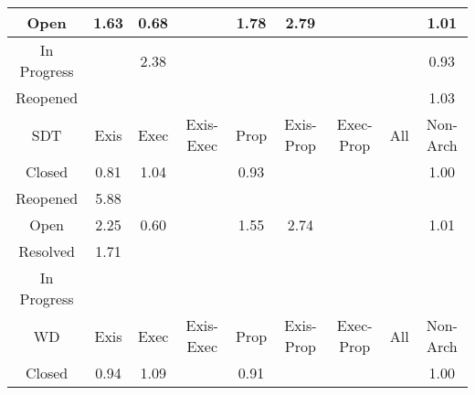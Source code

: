 \begin{tabular}{|c||c|c|c|c|c|c|c|c|}
\hline
Open & \cellcolor[rgb]{0.9068388404039985,0.8385026086124203,0.42} 1.63 & \cellcolor[rgb]{0.8516628524175754,0.5638708347765236,0.36555199558973706} 0.68 &  & \cellcolor[rgb]{0.9061209141027154,0.8381625382591809,0.42} 1.78 & \cellcolor[rgb]{0.9010562958286161,0.835763508550397,0.42} 2.79 &  &  & \cellcolor[rgb]{0.9099704616559043,0.8399860081527967,0.42} 1.01 \\ 
\hline
In Progress &  & \cellcolor[rgb]{0.9030875781986978,0.8367256949362253,0.42} 2.38 &  &  &  &  &  & \cellcolor[rgb]{0.8963532999479468,0.7754056197536144,0.4072630799514169} 0.93 \\ 
\hline
Reopened &  &  &  &  &  &  &  & \cellcolor[rgb]{0.9098280832496148,0.8399185657498176,0.42} 1.03 \\ 
\hline
\hline
SDT & Exis & Exec & Exis-Exec & Prop & Exis-Prop & Exec-Prop & All & Non-Arch \\ 
\hline
Closed & \cellcolor[rgb]{0.8746698173231633,0.6727704686629726,0.38702516283495236} 0.81 & \cellcolor[rgb]{0.9098164666295293,0.8399130631403035,0.42} 1.04 &  & \cellcolor[rgb]{0.89718570142927,0.7793456534318782,0.40803998800065205} 0.93 &  &  &  & \cellcolor[rgb]{0.9098982847470226,0.8395185478025738,0.4199050657638878} 1.00 \\ 
\hline
Reopened & \cellcolor[rgb]{0.8856188982041053,0.8284510570440499,0.42} 5.88 &  &  &  &  &  &  &  \\ 
\hline
Open & \cellcolor[rgb]{0.9037697183767478,0.8370488139679331,0.42} 2.25 & \cellcolor[rgb]{0.8375184815992133,0.4969208129029426,0.35235058282593235} 0.60 &  & \cellcolor[rgb]{0.9072502520117042,0.8386974877950177,0.42} 1.55 & \cellcolor[rgb]{0.9013101412747121,0.8358837511301267,0.42} 2.74 &  &  & \cellcolor[rgb]{0.90995836872732,0.8399802799234674,0.42} 1.01 \\ 
\hline
Resolved & \cellcolor[rgb]{0.906431143502178,0.8383094890273475,0.42} 1.71 &  &  &  &  &  &  &  \\ 
\hline
In Progress &  &  &  &  &  &  &  &  \\ 
\hline
\hline
WD & Exis & Exec & Exis-Exec & Prop & Exis-Prop & Exec-Prop & All & Non-Arch \\ 
\hline
Closed & \cellcolor[rgb]{0.8993670567910441,0.7896707354776085,0.4100759196716411} 0.94 & \cellcolor[rgb]{0.909533370194729,0.8397789648290821,0.42} 1.09 &  & \cellcolor[rgb]{0.8935528536021917,0.7621501737170411,0.40464933002871234} 0.91 &  &  &  & \cellcolor[rgb]{0.9091709537784018,0.8360758478844357,0.41922622352650846} 1.00 \\ 

\end{tabular}
